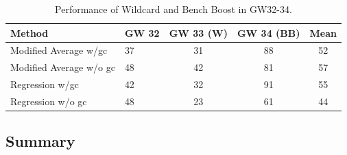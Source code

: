 \begin{table}[H]
\centering
\begin{tabular}{@{}llccc@{}}
\toprule
Method                  & GW 32 & GW 33 (W) & GW 34 (BB) & Mean \\ \midrule
Modified Average w/gc   & 37    & 31        & 88         & 52   \\
Modified Average w/o gc & 48    & 42        & 81         & 57   \\
Regression w/gc         & 42    & 32        & 91         & 55   \\
Regression w/o gc       & 48    & 23        & 61         & 44   \\ \bottomrule
\end{tabular}
\caption{Performance of Wildcard and Bench Boost in GW32-34.}
\label{tab:performance_wildcard_and_bench_boost}
\end{table}






\subsection{Summary}

